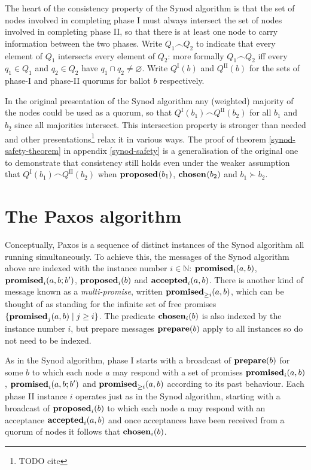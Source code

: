 \documentclass[journal]{IEEEtran}
\begin{document}
\def\I#1#2{{#1}^\textrm{I}_{#2}}
\def\II#1#2{{#1}^\textrm{II}_{#2}}
\def\QI#1{\I{Q}{#1}}
\def\QII#1{\II{Q}{#1}}

The heart of the consistency property of the Synod algorithm is that the set of
nodes involved in completing phase I must always intersect the set of nodes
involved in completing phase II, so that there is at least one node to carry
information between the two phases. Write $Q_1 \frown Q_2$ to indicate that
every element of $Q_1$ intersects every element of $Q_2$: more formally $Q_1
\frown Q_2$ iff every $q_1 \in Q_1$ and $q_2 \in Q_2$ have ${q_1 \cap q_2 \ne
\varnothing}$. Write $\QI{}(b)$ and $\QII{}(b)$ for the sets of
phase-I and phase-II quorums for ballot $b$ respectively.

In the original presentation of the Synod algorithm any (weighted) majority of
the nodes could be used as a quorum, so that $\QI{}(b_1) \frown \QII{}(b_2)$
for all $b_1$ and $b_2$ since all majorities intersect.  This intersection
property is stronger than needed and other presentations\footnote{TODO cite}
relax it in various ways. The proof of theorem \ref{synod-safety-theorem} in
appendix \ref{synod-safety} is a generalisation of the original one to
demonstrate that consistency still holds even under the weaker assumption that
$\QI{}(b_1) \frown \QII{}(b_2)$ when $\mathbf{proposed}_{}(b_1)$, $\mathbf{chosen}_{}(b_2)$ and $b_1
\succ b_2$.

\section{The Paxos algorithm}

Conceptually, Paxos is a sequence of distinct instances of the Synod algorithm
all running simultaneously. To achieve this, the messages of the Synod
algorithm above are indexed with the instance number $i \in \mathbb N$:
$\mathbf{promised}_{i}(a,b)$, $\mathbf{promised}_{i}(a,b;b')$, $\mathbf{proposed}_{i}(b)$ and $\mathbf{accepted}_{i}(a,b)$.
There is another kind of message known as a \textit{multi-promise}, written
$\mathbf{promised}_{\ge i}(a,b)$, which can be thought of as standing for the infinite set of
free promises ${\{ \mathbf{promised}_{j}(a,b) \mid j \ge i \}}$. The predicate
$\mathbf{chosen}_{i}(b)$ is also indexed by the instance number $i$, but prepare
messages $\mathbf{prepare}(b)$ apply to all instances so do not need to be indexed.

As in the Synod algorithm, phase I starts with a broadcast of $\mathbf{prepare}(b)$ for
some $b$ to which each node $a$ may respond with a set of promises
$\mathbf{promised}_{i}(a,b)$, $\mathbf{promised}_{i}(a,b;b')$ and $\mathbf{promised}_{\ge i}(a,b)$ according to its
past behaviour. Each phase II instance $i$ operates just as in the Synod
algorithm, starting with a broadcast of $\mathbf{proposed}_{i}(b)$ to which each node $a$
may respond with an acceptance $\mathbf{accepted}_{i}(a,b)$ and once acceptances have been
received from a quorum of nodes it follows that $\mathbf{chosen}_{i}(b)$.
\end{document}
